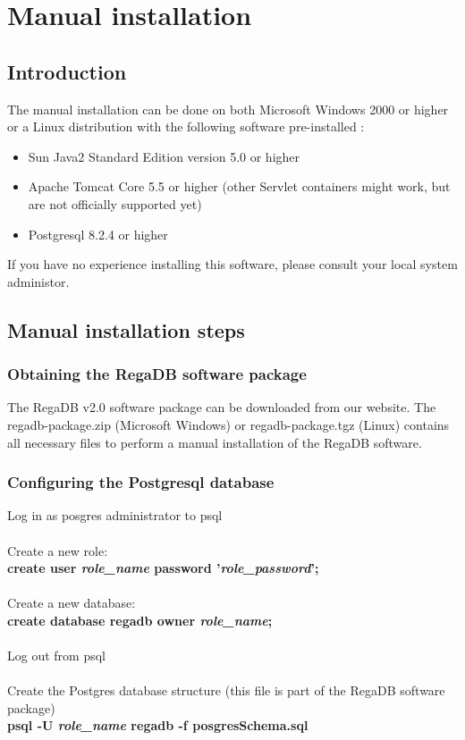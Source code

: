 \chapter{Manual installation}
\label{chapter:manual_install}

\section{Introduction}
The manual installation can be done on both Microsoft Windows 2000 or higher or a Linux distribution with the following software pre-installed : 
\begin{itemize}
\item Sun Java2 Standard Edition version 5.0 or higher
\item Apache Tomcat Core 5.5 or higher (other Servlet containers might work, but are not officially supported yet)
\item Postgresql 8.2.4 or higher
\end{itemize}
If you have no experience installing this software, please consult your local system administor.

\section{Manual installation steps}
\subsection{Obtaining the RegaDB software package}
The RegaDB v2.0 software package can be downloaded from our website. The regadb-package.zip (Microsoft Windows) or regadb-package.tgz (Linux) contains all necessary files to perform a manual installation of the RegaDB software.

\subsection{Configuring the Postgresql database}
Log in as posgres administrator to psql
\\
\\
Create a new role:
\\
\textbf{create user \textit{role\_name} password '\textit{role\_password}';}
\\
\\
Create a new database:
\\
\textbf{create database regadb owner \textit{role\_name};}
\\
\\
Log out from psql
\\
\\
Create the Postgres database structure (this file is part of the RegaDB software package)
\\
\textbf{psql -U \textit{role\_name} regadb -f posgresSchema.sql}

